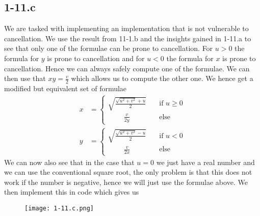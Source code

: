 \documentclass{article}
\begin{document}
\subsection*{1-11.c}
We are tasked with implementing an implementation that is not vulnerable to cancellation. We use the result from 11-1.b and the insights gained in 1-11.a to see that only one of the formulae can be prone to cancellation. For $u > 0$ the formula for $y$ is prone to cancellation and for $u < 0$ the formula for $x$ is prone to cancellation. Hence we can always safely compute one of the formulae. We can then use that $xy = \frac{v}{2}$ which allows us to compute the other one. We hence get a modified but equivalent set of formulae
\begin{align*}
    x &=
    \begin{cases}
    \sqrt{\frac{\sqrt{u^{2}+v^{2}} + u}{2}} \quad &\text{if } u \geq 0 \\
    \qquad\:\frac{v}{2y} &\text{else}
    \end{cases} \\[2mm]
    y &=
    \begin{cases}
    \sqrt{\frac{\sqrt{u^{2}+v^{2}} - u}{2}} \quad &\text{if } u < 0 \\
    \qquad\:\frac{v}{2x} &\text{else}
    \end{cases}
\end{align*}
We can now also see that in the case that $u = 0$ we just have a real number and we can use the conventional square root, the only problem is that this does not work if the number is negative, hence we will just use the formulae above. We then implement this in code which gives us
\begin{figure}[!hbt]
    \centering
\texttt{[image: 1-11.c.png]}
\end{figure}
\end{document}

